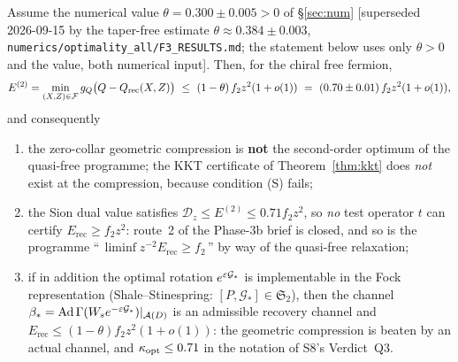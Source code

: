 \documentclass[11pt]{article}
\newcommand{\Erecc}{E_{\mathrm{rec}}}
\newcommand{\Stwo}{\mathfrak S_2}
\begin{document}
\begin{theorem}\label{thm:value}
Assume the numerical value $\theta=0.300\pm0.005>0$ of \S\ref{sec:num} [superseded 2026-09-15 by the taper-free estimate $\theta\approx0.384\pm0.003$, \texttt{numerics/optimality\_all/F3\_RESULTS.md}; the statement below uses only $\theta>0$ and the value, both numerical input].  Then, for the
chiral free fermion,
\begin{equation}\label{eq:final}
 E^{(2)}=\min_{(X,Z)\in\cF}g_Q\bigl(Q-Q_{\rm rec}(X,Z)\bigr)\ \le\ (1-\theta)\,f_2z^2(1+o(1))
 \ =\ (0.70\pm0.01)\,f_2z^2(1+o(1)),
\end{equation}
and consequently
\begin{enumerate}[leftmargin=1.6em,itemsep=1pt]
\item the zero-collar geometric compression is \textbf{not} the second-order optimum of
 the quasi-free programme; the KKT certificate of Theorem~\ref{thm:kkt} does \emph{not}
 exist at the compression, because condition {\rm(S)} fails;
\item the Sion dual value satisfies $\mathcal D_z\le E^{(2)}\le0.71f_2z^2$, so
 \emph{no} test operator $t$ can certify $\Erecc\ge f_2z^2$: route~2 of the Phase-3b brief
 is closed, and so is the programme
 ``\,$\liminf z^{-2}\Erecc\ge f_2$\,'' by way of the quasi-free relaxation;
\item if in addition the optimal rotation $e^{\varepsilon\mathcal G_*}$ is implementable in the
 Fock representation (Shale--Stinespring: $[P,\mathcal G_*]\in\Stwo$), then the channel
 $\beta_*=\operatorname{Ad}\Gamma(W_s e^{-\varepsilon\mathcal G_*})|_{\mathcal A(D)}$ is an admissible
 recovery channel and $\Erecc\le(1-\theta)f_2z^2(1+o(1))$: the geometric compression is
 beaten by an actual channel, and $\kappa_{\rm opt}\le0.71$ in the notation of S8's
 Verdict~Q3.
\end{enumerate}
\end{theorem}
\end{document}
